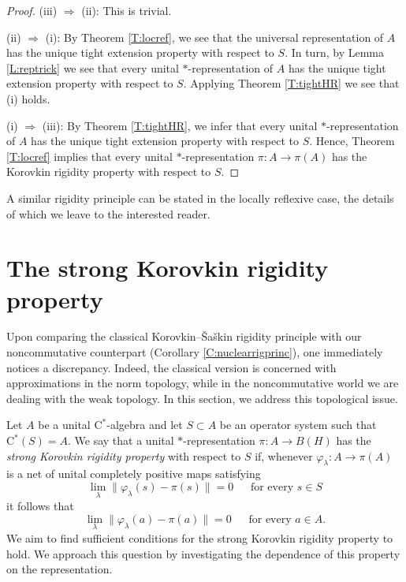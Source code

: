 \documentclass[10pt]{amsart}
\newcommand{\rC}{\mathrm{C}}
\renewcommand{\phi}{\varphi}
\theoremstyle{definition}
\begin{document}
\begin{proof}
(iii) $\Rightarrow$ (ii): This is trivial.


(ii) $\Rightarrow$ (i): By Theorem \ref{T:locref}, we see that the universal representation of $A$ has the unique tight extension property with respect to $S$. In turn, by Lemma \ref{L:reptrick} we see that every unital $*$-representation of $A$ has the unique tight extension property with respect to $S$. Applying Theorem \ref{T:tightHR} we see that (i) holds.

(i) $\Rightarrow$ (iii): By Theorem \ref{T:tightHR}, we infer that every unital $*$-representation of $A$ has the unique tight extension property with respect to $S$. Hence, Theorem \ref{T:locref} implies that every unital $*$-representation $\pi:A\to \pi(A)$ has the Korovkin rigidity property with respect to $S$.
\end{proof}


A similar rigidity principle can be stated in the locally reflexive case, the details of which we leave to the interested reader.


\section{The strong Korovkin rigidity property}\label{S:NormK}

Upon comparing the classical Korovkin--\v Sa\v skin rigidity principle with our noncommutative counterpart (Corollary \ref{C:nuclearrigprinc}), one immediately notices a discrepancy. Indeed, the classical version  is concerned with approximations in the norm topology,  while in the noncommutative world we are dealing with the weak topology. In this section, we address this topological issue.


Let $A$ be a unital $\rC^*$-algebra and let $S\subset A$ be an operator system such that $\rC^*(S) = A$. We say that a unital $*$-representation $\pi: A\rightarrow B(H)$ has the \emph{strong Korovkin rigidity  property} with respect to $S$ if, whenever $\phi_\lambda:A\rightarrow\pi(A)$ is a net of unital completely positive maps satisfying
\[
\lim_\lambda \|\phi_\lambda(s)-\pi(s)\|=0 \quad \ \text{ for every } s\in S 
\]
it follows that
\[
\lim_\lambda \|\phi_\lambda(a)-\pi(a)\|=0 \quad \ \text{ for every } a\in A.
\]
We aim to find sufficient conditions for the strong Korovkin rigidity property to hold. We approach this question by investigating the dependence of this property on the representation. 
\end{document}
